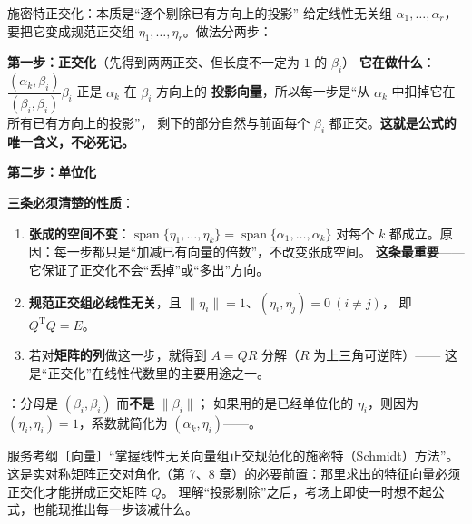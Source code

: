 

\begin{fdeep}{施密特正交化：本质是“逐个剔除已有方向上的投影”}
给定线性无关组 $\alpha_1,\dots,\alpha_r$，要把它变成规范正交组 $\eta_1,\dots,\eta_r$。做法分两步：

\textbf{第一步：正交化}（先得到两两正交、但长度不一定为 $1$ 的 $\beta_i$）
\textbf{它在做什么}：$\dfrac{(\alpha_k,\beta_i)}{(\beta_i,\beta_i)}\beta_i$ 正是 $\alpha_k$ 在 $\beta_i$ 方向上的
\textbf{投影向量}，所以每一步是“从 $\alpha_k$ 中扣掉它在所有已有方向上的投影”，
剩下的部分自然与前面每个 $\beta_i$ 都正交。\textbf{这就是公式的唯一含义，不必死记。}

\textbf{第二步：单位化}

\textbf{三条必须清楚的性质}：
\begin{enumerate}[leftmargin=2.2em,itemsep=0.22em]
\item \textbf{张成的空间不变}：$\operatorname{span}\{\eta_1,\dots,\eta_k\}=\operatorname{span}\{\alpha_1,\dots,\alpha_k\}$
      对每个 $k$ 都成立。原因：每一步都只是“加减已有向量的倍数”，不改变张成空间。
      \textbf{这条最重要}——它保证了正交化不会“丢掉”或“多出”方向。
\item \textbf{规范正交组必线性无关}，且 $\lVert\eta_i\rVert=1$、$(\eta_i,\eta_j)=0\ (i\ne j)$，
      即 $Q^{\mathrm T}Q=E$。
\item 若对\textbf{矩阵的列}做这一步，就得到 $A=QR$ 分解（$R$ 为上三角可逆阵）——
      这是“正交化”在线性代数里的主要用途之一。
\end{enumerate}

：分母是 $(\beta_i,\beta_i)$ 而\textbf{不是} $\lVert\beta_i\rVert$；
如果用的是已经单位化的 $\eta_i$，则因为 $(\eta_i,\eta_i)=1$，系数就简化为
$(\alpha_k,\eta_i)$——。

\fbref{}服务考纲〔向量〕“掌握线性无关向量组正交规范化的施密特（Schmidt）方法”。
这是实对称矩阵正交对角化（第 7、8 章）的必要前置：那里求出的特征向量必须正交化才能拼成正交矩阵 $Q$。
理解“投影剔除”之后，考场上即使一时想不起公式，也能现推出每一步该减什么。
\end{fdeep}

